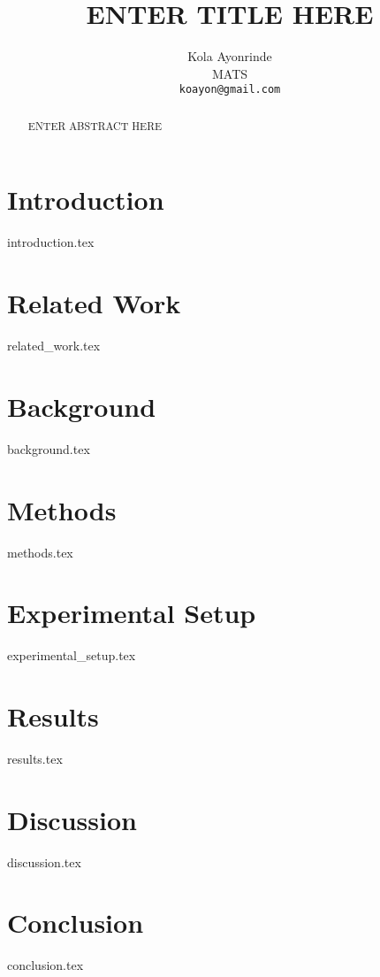 \documentclass{article} %
\title{ENTER TITLE HERE}
\author{{\hspace{1mm}Kola Ayonrinde} \\
        MATS \\
	\texttt{koayon@gmail.com} \\
}
\begin{document}
\maketitle

\begin{abstract}
ENTER ABSTRACT HERE
\end{abstract}


\section{Introduction}
\label{sec:intro}
{introduction.tex}

\section{Related Work}
\label{sec:related_work}
{related_work.tex}

\section{Background}
\label{sec:background}
{background.tex}

\section{Methods}
\label{sec:methods}
{methods.tex}

\hypertarget{setup}{%
\section{Experimental Setup}\label{setup}}
{experimental_setup.tex}

\section{Results}
\label{sec:results}
{results.tex}

\hypertarget{discussion}{%
\section{Discussion}\label{discussion}}
{discussion.tex}

\hypertarget{conclusion}{%
\section{Conclusion}\label{conclusion}}
{conclusion.tex}
\end{document}
